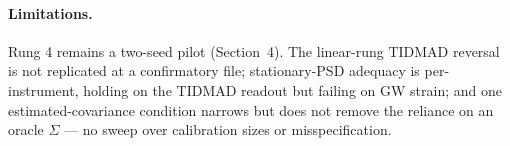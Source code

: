 \paragraph{Limitations.}
Rung 4 remains a two-seed pilot (Section~4). The linear-rung TIDMAD reversal is not replicated at a confirmatory file; stationary-PSD adequacy is per-instrument, holding on the TIDMAD readout but failing on GW strain; and one estimated-covariance condition narrows but does not remove the reliance on an oracle $\Sigma$ --- no sweep over calibration sizes or misspecification.
